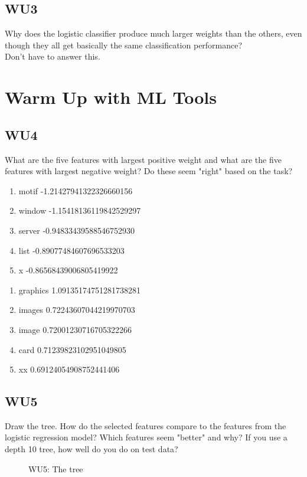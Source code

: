 \documentclass[a4paper,11pt]{article}
\begin{document}
\subsection{WU3}
\textsf{Why does the logistic classifier produce much larger weights
  than the others, even though they all get basically the same
  classification performance?}\\ Don't have to answer this.

\section{Warm Up with ML Tools}
\label{sec:warmup}
\subsection{WU4}
\textsf{What are the five features with largest positive weight and what
are the five features with largest negative weight? Do these seem "right"
based on the task?}

\begin{enumerate}
 \item motif -1.21427941322326660156
 \item window -1.15418136119842529297
 \item server -0.94833439588546752930
 \item list -0.89077484607696533203
 \item x -0.86568439006805419922
\end{enumerate}

\begin{enumerate}
 \item graphics 1.09135174751281738281
 \item images 0.72243607044219970703
 \item image 0.72001230716705322266
 \item card 0.71239823102951049805
 \item xx 0.69124054908752441406
\end{enumerate}

\subsection{WU5}
\textsf{ Draw the tree. How do the selected features compare to the
  features from the logistic regression model? Which features seem
  "better" and why? If you use a depth 10 tree, how well do you do on
  test data?}\\
\begin{figure}[h!]
  \caption{WU5: The tree}
  \centering
\end{figure}
\end{document}
